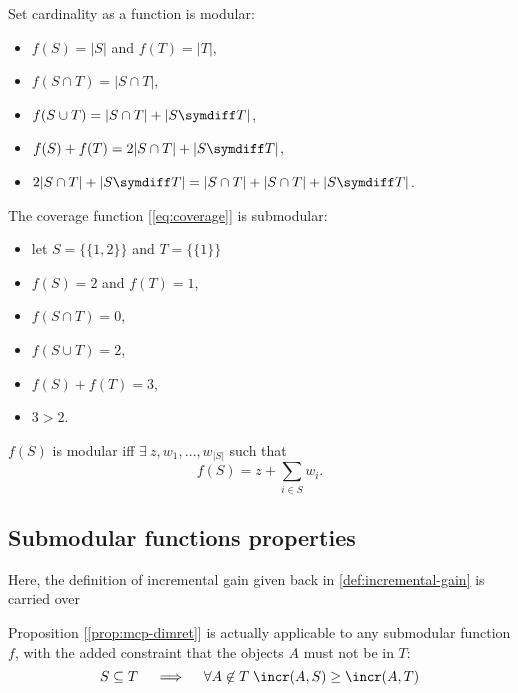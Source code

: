\begin{example}
    Set cardinality as a function is modular:
    \begin{itemize}
        \item $f(S) = |S|$ and $f(T) = |T|$,
        \item $f(S \cap T) = |S \cap T|$,
        \item $f(S \cup T) = |S \cap T| + |S \symdiff T|$,
        \item $f(S) + f(T) = 2 |S \cap T| + |S \symdiff T|$,
        \item $2 |S \cap T| + |S \symdiff T| = |S \cap T| + |S \cap T| + |S \symdiff T|$.
    \end{itemize}    
\end{example}

\begin{example}
    The coverage function [\ref{eq:coverage}] is submodular:
    \begin{itemize}
        \item let $S=\{\{1,2\}\}$ and $T = \{\{1\}\}$
        \item $f(S)=2$ and $f(T)=1$,
        \item $f(S \cap T) = 0$,
        \item $f(S \cup T) = 2$,
        \item $f(S) + f(T) = 3$,
        \item $3 > 2$.
    \end{itemize}    
\end{example}

\begin{theorem}\label{thm:modular}
    $f(S)$ is modular iff $\exists\ z, w_1, \ldots, w_{|S|}$ such that
    \begin{equation}
        f(S) = z + \sum_{i \in S} w_i.
    \end{equation}
\end{theorem}



\subsection{Submodular functions properties} \label{sec:submodular-properties}

Here, the definition of incremental gain given back in \ref{def:incremental-gain} is carried over

\begin{lemma} \label{lem:dim-return}
    Proposition [\ref{prop:mcp-dimret}] is actually applicable to any submodular function $f$, with the added constraint that the objects $A$ must not be in $T$:
    \[
        S \subseteq T \quad \implies \quad \forall A \not\in T \; \incr (A, S) \geq \incr(A, T)
    \]
\end{lemma}

